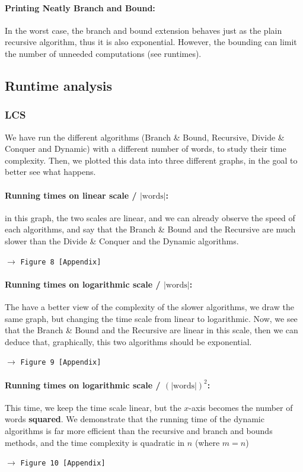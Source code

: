 \documentclass[a4paper,12pt]{article}
\newcommand{\see}[1]{\begin{flushright}$\rightarrow$ \texttt{#1 [Appendix]}\end{flushright}}
\newcommand{\seeFigure}[1]{\see{Figure #1}}
\begin{document}
			\paragraph{Printing Neatly Branch and Bound:} In the worst case, the branch and bound extension behaves just as the plain recursive algorithm, thus it is also exponential. However, the bounding can limit the number of unneeded computations (see runtimes).



		\subsection{Runtime analysis}
			\subsubsection{LCS}
				We have run the different algorithms (Branch \& Bound, Recursive, Divide \& Conquer and Dynamic) with a different number of words, to study their time complexity. Then, we plotted this data into three different graphs, in the goal to better see what happens.

				\paragraph{Running times on linear scale / $|\text{words}|$:} in this graph, the two scales are linear, and we can already observe the speed of each algorithms, and say that the Branch \& Bound and the Recursive are much slower than the Divide \& Conquer and the Dynamic algorithms.
				\seeFigure{8}
				
				\paragraph{Running times on logarithmic scale / $|\text{words}|$:} The have a better view of the complexity of the slower algorithms, we draw the same graph, but changing the time scale from linear to logarithmic. Now, we see that the Branch \& Bound and the Recursive are linear in this scale, then we can deduce that, graphically, this two algorithms should be exponential.
				\seeFigure{9}
				
				\paragraph{Running times on logarithmic scale / $(|\text{words}|)^2$:} This time, we keep the time scale linear, but the $x$-axis becomes the number of words \textbf{squared}. We demonstrate that the running time of the dynamic algorithms is far more efficient than the recursive and branch and bounds methods, and the time complexity is quadratic in $n$ (where $m = n$)
				\seeFigure{10}
\end{document}
